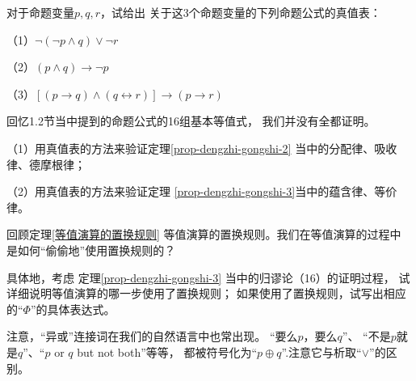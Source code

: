 \begin{prob}对于命题变量$p,q,r$，试给出
关于这3个命题变量的下列命题公式的真值表：

（1）$\neg(\neg p\wedge q)\vee\neg r$

（2）$(p\wedge q)\rightarrow\neg p$

（3）$[(p\rightarrow q)\wedge(q\leftrightarrow r)]
\rightarrow(p\rightarrow r)$
\end{prob}\vs

\begin{prob}[基本等值公式的验证]
回忆1.2节当中提到的命题公式的16组基本等值式，
我们并没有全都证明。

（1）用真值表的方法来验证定理\ref{prop-dengzhi-gongshi-2}
当中的分配律、吸收律、德摩根律；

（2）用真值表的方法来验证定理
\ref{prop-dengzhi-gongshi-3}当中的蕴含律、等价律。
\end{prob}\vs

\begin{prob}[关于等值演算的置换规则]
回顾定理\ref{等值演算的置换规则}
等值演算的置换规则。我们在等值演算的过程中
是如何“偷偷地”使用置换规则的？

具体地，考虑
定理\ref{prop-dengzhi-gongshi-3}
当中的归谬论（16）的证明过程，
试详细说明等值演算的哪一步使用了置换规则；
如果使用了置换规则，试写出相应的“$\Phi$”的具体表达式。
\end{prob}\vs


注意，“异或”连接词在我们的自然语言中也常出现。
“要么$p$，要么$q$”、
“不是$p$就是$q$”、“$p$ or $q$ but not both”等等，
都被符号化为“$p\oplus q$”.注意它与析取“$\vee$”的区别。\vs

